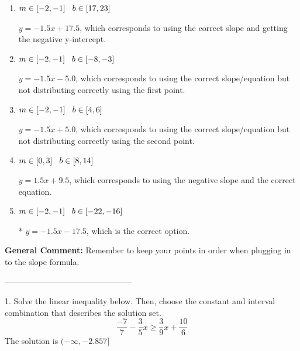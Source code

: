 \documentclass{extbook}[14pt]
\begin{document}
\begin{enumerate}[label=\Alph*.] 
\item $ m \in [-2, -1] \hspace*{3mm} b \in [17, 23] $ 

  $y = -1.5x + 17.5$, which corresponds to using the correct slope and getting the negative y-intercept. 
\item $ m \in [-2, -1] \hspace*{3mm} b \in [-8, -3] $ 

  $y = -1.5x -5.0$, which corresponds to using the correct slope/equation but not distributing correctly using the first point. 
\item $ m \in [-2, -1] \hspace*{3mm} b \in [4, 6] $ 

  $y = -1.5x + 5.0$, which corresponds to using the correct slope/equation but not distributing correctly using the second point. 
\item $ m \in [0, 3] \hspace*{3mm} b \in [8, 14] $ 

  $y = 1.5x + 9.5$, which corresponds to using the negative slope and the correct equation. 
\item $ m \in [-2, -1] \hspace*{3mm} b \in [-22, -16] $ 

 * $y = -1.5x -17.5$, which is the correct option. 
\end{enumerate} 
 
\textbf{General Comment:} Remember to keep your points in order when plugging in to the slope formula. 

-----------------------------------------------

1. Solve the linear inequality below. Then, choose the constant and interval combination that describes the solution set.
\[ \frac{-7}{7} - \frac{3}{5} x \geq \frac{3}{9} x + \frac{10}{6} \] 
The solution is $ (-\infty, -2.857] $ 
\end{document}
